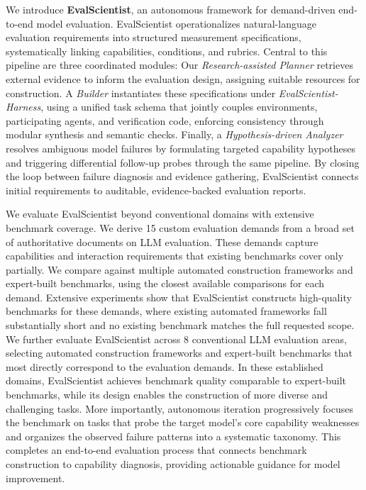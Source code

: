 \documentclass{article} %
\begin{document}
	
We introduce \textbf{EvalScientist}, an autonomous framework for demand-driven end-to-end model evaluation. EvalScientist operationalizes natural-language evaluation requirements into structured measurement specifications, systematically linking capabilities, conditions, and rubrics. Central to this pipeline are three coordinated modules:
Our \emph{Research-assisted Planner} retrieves external evidence to inform the evaluation design, assigning suitable resources for construction. 
A \emph{Builder} instantiates these specifications under \emph{EvalScientist-Harness}, using a unified task schema that jointly couples environments, participating agents, and verification code, enforcing consistency through modular synthesis and semantic checks.
Finally, a \emph{Hypothesis-driven Analyzer} resolves ambiguous model failures by formulating targeted capability hypotheses and triggering differential follow-up probes through the same pipeline. By closing the loop between failure diagnosis and evidence gathering, EvalScientist connects initial requirements to auditable, evidence-backed evaluation reports.
	
	We evaluate EvalScientist beyond conventional domains with extensive
	benchmark coverage. We derive 15 custom evaluation demands from a broad set of
	authoritative documents on LLM evaluation. These demands capture capabilities
	and interaction requirements that existing benchmarks cover only partially.
	We compare against multiple automated construction frameworks and expert-built
	benchmarks, using the closest available comparisons for each demand.
	Extensive experiments show that EvalScientist constructs high-quality
	benchmarks for these demands, where existing automated frameworks fall
	substantially short and no existing benchmark matches the full requested scope.
	We further evaluate EvalScientist across 8 conventional LLM evaluation
	areas, selecting automated construction frameworks and expert-built benchmarks
	that most directly correspond to the evaluation demands. In these established
	domains, EvalScientist achieves benchmark quality comparable to expert-built
	benchmarks, while its design enables the construction of more diverse and
	challenging tasks.
	More importantly, autonomous iteration progressively focuses the benchmark on
	tasks that probe the target model's core capability weaknesses and organizes
	the observed failure patterns into a systematic taxonomy. This completes an
	end-to-end evaluation process that connects benchmark construction to capability
	diagnosis, providing actionable guidance for model improvement.
	
\end{document}
